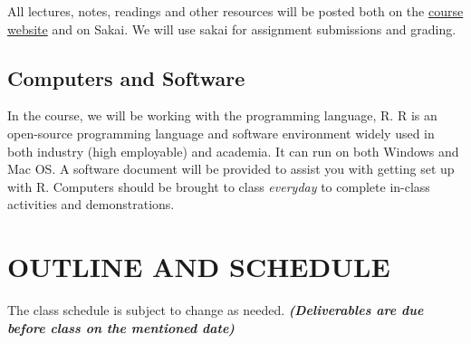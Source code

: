 \documentclass[11pt,]{article}
\begin{document}
All lectures, notes, readings and other resources will be posted both on
the \href{geog215-spds.rbind.io}{course website} and on Sakai. We will
use sakai for assignment submissions and grading.

\hypertarget{computers-and-software}{%
\subsection{Computers and Software}\label{computers-and-software}}

In the course, we will be working with the programming language, R. R is
an open-source programming language and software environment widely used
in both industry (high employable) and academia. It can run on both
Windows and Mac OS. A software document will be provided to assist you
with getting set up with R. Computers should be brought to class
\emph{everyday} to complete in-class activities and demonstrations.

\hypertarget{outline-and-schedule}{%
\section{OUTLINE AND SCHEDULE}\label{outline-and-schedule}}

The class schedule is subject to change as needed.
\textbf{\emph{(Deliverables are due before class on the mentioned
date)}} \begingroup\fontsize{10}{12}\selectfont
\end{document}
